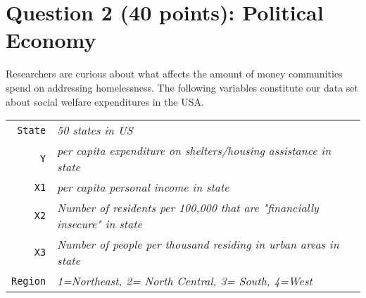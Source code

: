 \documentclass[12pt,letterpaper]{article}
\begin{document}
\section*{Question 2 (40 points): Political Economy}

\noindent Researchers are curious about what affects the amount of money communities spend on addressing homelessness. The following variables constitute our data set about social welfare expenditures in the USA. \\
\vspace{.5cm}


\begin{tabular}{r|l}
	\texttt{State} &\emph{50 states in US} \\
	\texttt{Y} & \emph{per capita expenditure on shelters/housing assistance in state}\\
	\texttt{X1} &\emph{per capita personal income in state} \\
	\texttt{X2} &  \emph{Number of residents per 100,000 that are "financially insecure" in state}\\
	\texttt{X3} &  \emph{Number of people per thousand residing in urban areas in state} \\
	\texttt{Region} &  \emph{1=Northeast, 2= North Central, 3= South, 4=West} \\
\end{tabular}
\end{document}
